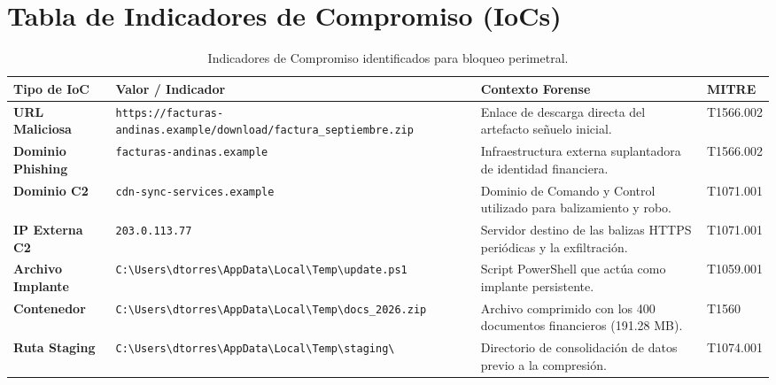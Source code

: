 \documentclass[11pt,a4paper]{article}
\begin{document}
\section{Tabla de Indicadores de Compromiso (IoCs)}

\begin{table}[h!]
\centering
\small
\begin{tabularx}{\textwidth}{l p{7.5cm} X l}
\toprule
\textbf{Tipo de IoC} & \textbf{Valor / Indicador} & \textbf{Contexto Forense} & \textbf{MITRE} \\
\midrule
\textbf{URL Maliciosa} & \texttt{https://facturas-andinas.example/download/factura\_septiembre.zip} & Enlace de descarga directa del artefacto señuelo inicial. & T1566.002 \\
\textbf{Dominio Phishing} & \texttt{facturas-andinas.example} & Infraestructura externa suplantadora de identidad financiera. & T1566.002 \\
\textbf{Dominio C2} & \texttt{cdn-sync-services.example} & Dominio de Comando y Control utilizado para balizamiento y robo. & T1071.001 \\
\textbf{IP Externa C2} & \texttt{203.0.113.77} & Servidor destino de las balizas HTTPS periódicas y la exfiltración. & T1071.001 \\
\textbf{Archivo Implante} & \texttt{C:\textbackslash Users\textbackslash dtorres\textbackslash AppData\textbackslash Local\textbackslash Temp\textbackslash update.ps1} & Script PowerShell que actúa como implante persistente. & T1059.001 \\
\textbf{Contenedor} & \texttt{C:\textbackslash Users\textbackslash dtorres\textbackslash AppData\textbackslash Local\textbackslash Temp\textbackslash docs\_2026.zip} & Archivo comprimido con los 400 documentos financieros (191.28 MB). & T1560 \\
\textbf{Ruta Staging} & \texttt{C:\textbackslash Users\textbackslash dtorres\textbackslash AppData\textbackslash Local\textbackslash Temp\textbackslash staging\textbackslash} & Directorio de consolidación de datos previo a la compresión. & T1074.001 \\
\bottomrule
\end{tabularx}
\caption{Indicadores de Compromiso identificados para bloqueo perimetral.}
\end{table}
\end{document}
